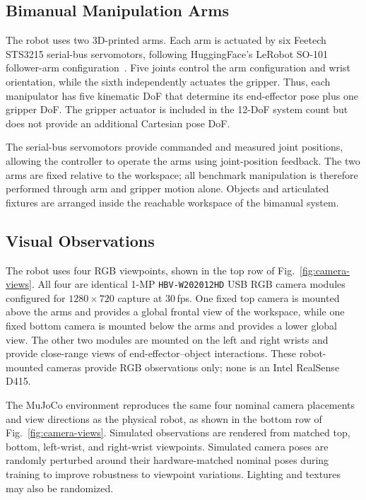 \documentclass[10pt,conference]{IEEEtran}
\begin{document}
\subsection{Bimanual Manipulation Arms}

The robot uses two 3D-printed arms. Each arm is actuated by six Feetech STS3215
serial-bus servomotors, following HuggingFace's LeRobot SO-101 follower-arm
configuration~\cite{lerobotso101}. Five joints control the arm configuration
and wrist orientation, while the sixth independently actuates the gripper.
Thus, each manipulator has five kinematic DoF that determine its end-effector
pose plus one gripper DoF. The gripper actuator is included in the 12-DoF system
count but does not provide an additional Cartesian pose DoF.

The serial-bus servomotors provide commanded and measured joint positions,
allowing the controller to operate the arms using joint-position feedback.
The two arms are fixed relative to the workspace; all benchmark manipulation is
therefore performed through arm and gripper motion alone. Objects and
articulated fixtures are arranged inside the reachable workspace of the
bimanual system.

\subsection{Visual Observations}

The robot uses four RGB viewpoints, shown in the top row of
Fig.~\ref{fig:camera-views}. All four are identical 1-MP
\texttt{HBV-W202012HD} USB RGB camera modules configured for
\(1280\times720\) capture at 30\,fps. One fixed top camera is mounted above the
arms and provides a global frontal view of the workspace, while one fixed
bottom camera is mounted below the arms and provides a lower global view. The
other two modules are mounted on the left and right wrists and provide
close-range views of end-effector--object interactions. These robot-mounted
cameras provide RGB observations only; none is an Intel RealSense D415.

The MuJoCo environment reproduces the same four nominal camera placements and
view directions as the physical robot, as shown in the bottom row of
Fig.~\ref{fig:camera-views}. Simulated observations are rendered from matched
top, bottom, left-wrist, and right-wrist viewpoints. Simulated camera poses are randomly perturbed around their hardware-matched
nominal poses during training to improve robustness to viewpoint variations.
Lighting and textures may also be randomized.
\end{document}
